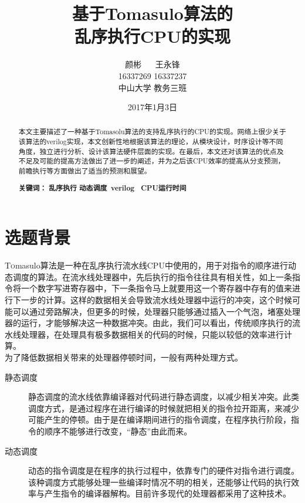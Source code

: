 \documentclass[twoside]{article}
\title{\vspace{-15mm}\fontsize{24pt}{10pt}\selectfont\textbf{基于Tomasulo算法的\\乱序执行CPU的实现}} %
\author{
\large
\textsc{颜彬 \(\quad\) 王永锋}\\[2mm] %
\textsc{16337269 16337237} \\ [2mm]
\normalsize 中山大学 教务三班  \\ %
\vspace{-5mm}
}
\date{2017年1月3日}
\begin{document}
\maketitle %

\thispagestyle{fancy} %

\begin{abstract}
	本文主要描述了一种基于Tomasolu算法的支持乱序执行的CPU的实现。网络上很少关于该算法的verilog实现，本文创新性地根据该算法的理论，从模块设计，时序设计等不同角度，独立进行分析、设计该算法硬件层面的实现。在最后，本文还对该算法的优点及不足及可能的提高方法做出了进一步的阐述，并为之后该CPU效率的提高从分支预测，前瞻执行等方面做出了适当的预测和展望。

	\textbf{关键词： }\textbf{乱序执行} \textbf{动态调度} \textbf{$\ $verilog} \textbf{ $\ $  CPU运行时间}
\end{abstract}


\section{选题背景}
\lettrine[nindent=0em,lines=3]{T}omasulo算法是一种在乱序执行流水线CPU中使用的，用于对指令的顺序进行动态调度的算法。在流水线处理器中，先后执行的指令往往具有相关性，如上一条指令将一个数字写进寄存器中，下一条指令马上就要用这一个寄存器中存有的值来进行下一步的计算。这样的数据相关会导致流水线处理器中运行的冲突，这个时候可能可以通过旁路解决，但更多的时候，处理器只能够通过插入一个气泡，堵塞处理器的运行，才能够解决这一种数据冲突。由此，我们可以看出，传统顺序执行的流水线处理器，在处理具有极多数据相关的代码的时候，只能以较低的效率进行计算。\\

为了降低数据相关带来的处理器停顿时间，一般有两种处理方式。\cite{book:zcs}
\begin{description}
	\item[静态调度] 静态调度的流水线依靠编译器对代码进行静态调度，以减少相关冲突。此类调度方式，是通过程序在进行编译的时候就把相关的指令拉开距离，来减少可能产生的停顿。由于是在编译期间进行的指令调度，在程序执行阶段，指令的顺序不能够进行改变，“静态”由此而来。
	\item[动态调度]	动态的指令调度是在程序的执行过程中，依靠专门的硬件对指令进行调度。该种调度方式能够处理一些编译时情况不明的相关，还能够让代码的执行效率与产生指令的编译器解构。目前许多现代的处理器都采用了这种技术。
\end{description}
\end{document}
